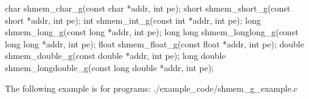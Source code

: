 
\begin{apidefinition}

\begin{Csynopsis}
char shmem_char_g(const char *addr, int pe);
short shmem_short_g(const short *addr, int pe);
int shmem_int_g(const int *addr, int pe);
long shmem_long_g(const long *addr, int pe);
long long  shmem_longlong_g(const long long *addr, int pe);
float shmem_float_g(const float *addr, int pe);
double shmem_double_g(const double *addr, int pe);
long double shmem_longdouble_g(const long double *addr, int pe);
\end{Csynopsis}

\begin{apiarguments}
\end{apiarguments}




\begin{apiexamples}

\apicexample
    {The following  example is for \CorCpp{} programs:}
    {./example_code/shmem_g_example.c}
    {}
\end{apiexamples}

\end{apidefinition}

